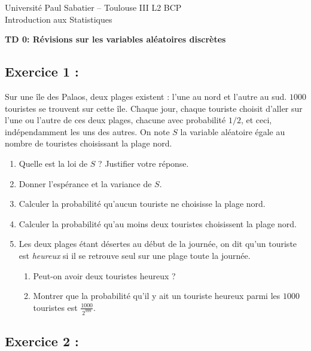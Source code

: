 \documentclass[11pt]{article}
\numberwithin{equation}{section}
\begin{document}
\noindent Université Paul Sabatier -- Toulouse III
\hfill L2 BCP\\
\noindent Introduction aux Statistiques

\bigskip
\bigskip


\begin{center}
{\bf \large TD 0: Révisions sur les variables aléatoires discrètes}\\
{\bf \large }
\end{center}

\bigskip

\subsection*{Exercice 1 :}

\noindent
Sur une île des Palaos, deux plages existent : l'une au nord et l'autre au sud. 
$1000$ touristes se trouvent sur cette île. Chaque jour, chaque touriste choisit d'aller sur l'une ou l'autre de ces deux plages, chacune  avec probabilité $1/2$, et ceci, indépendamment les uns des autres. On note $S$ la variable aléatoire égale au nombre de touristes choisissant la plage nord.
\begin{enumerate}
\item Quelle est la loi de $S$ ? Justifier votre réponse.
\item Donner l'espérance et la variance de $S$.
\item Calculer la probabilité qu'aucun touriste ne choisisse la plage nord.
\item Calculer la probabilité qu'au moins deux touristes choisissent la plage nord.
\item Les deux plages étant désertes au début de la journée, on dit qu'un touriste est \emph{heureux} si il se retrouve seul sur une plage toute  la journée. 
\begin{enumerate}
\item Peut-on avoir deux touristes heureux ?
\item
Montrer que la probabilité qu'il y ait un touriste heureux parmi les $1000$ touristes est
$ \displaystyle
\frac{1000}{2^{999}}.
$
\end{enumerate}
\end{enumerate}

\bigskip
\thispagestyle{empty}


\subsection*{Exercice 2 : }
\end{document}
